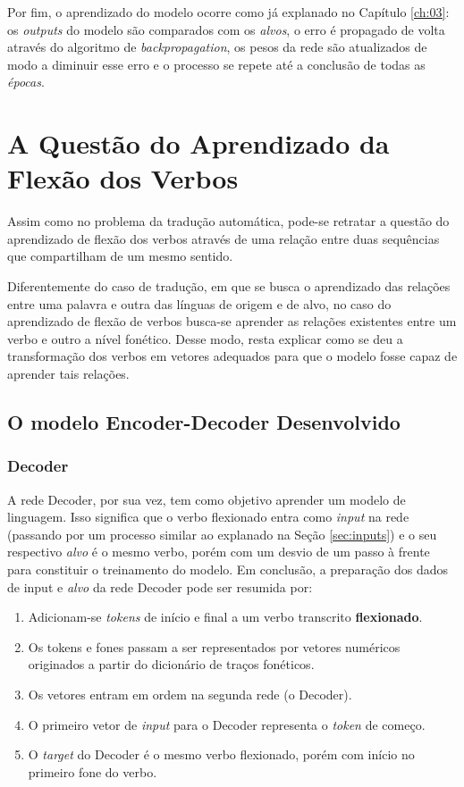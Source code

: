  
 
 Por fim, o aprendizado do modelo ocorre como já explanado no Capítulo \ref{ch:03}: os \textit{outputs} do modelo são comparados com os \textit{alvos}, o erro é propagado de volta através do algoritmo de \textit{backpropagation}, os pesos da rede são atualizados de modo a diminuir esse erro e o processo se repete até a conclusão de todas as \textit{épocas}.
 
\section{A Questão do Aprendizado da Flexão dos Verbos}

Assim como no problema da tradução automática, pode-se retratar a questão do aprendizado de flexão dos verbos através de uma relação entre duas sequências que compartilham de um mesmo sentido.



Diferentemente do caso de tradução, em que se busca o aprendizado das relações entre uma palavra e outra das línguas de origem e de alvo, no caso do aprendizado de flexão de verbos busca-se aprender as relações existentes entre um verbo e outro a nível fonético. Desse modo, resta explicar como se deu a transformação dos verbos em vetores adequados para que o modelo fosse capaz de aprender tais relações.



\subsection{O modelo Encoder-Decoder Desenvolvido}


\subsubsection{Decoder}

A rede Decoder, por sua vez, tem como objetivo aprender um modelo de linguagem. Isso significa que o verbo flexionado entra como \textit{input} na rede (passando por um processo similar ao explanado na Seção \ref{sec:inputs}) e o seu respectivo \textit{alvo} é o mesmo verbo, porém com um desvio de um passo à frente para constituir o treinamento do modelo. Em conclusão, a preparação dos dados de input e \textit{alvo} da rede Decoder pode ser resumida por:  

\begin{enumerate}
    \item Adicionam-se \textit{tokens} de início e final a um verbo transcrito \textbf{flexionado}.
    \item Os tokens e fones passam a ser representados por vetores numéricos originados a partir do dicionário de traços fonéticos.
    \item Os vetores entram em ordem na segunda rede (o Decoder).
    \item O primeiro vetor de \textit{input} para o Decoder representa o \textit{token} de começo.
    \item O \textit{target} do Decoder é o mesmo verbo flexionado, porém com início no primeiro fone do verbo.
\end{enumerate}

